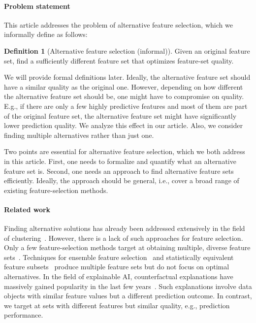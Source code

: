 \documentclass{article}
\theoremstyle{definition}
\newtheorem{definition}{Definition}
\begin{document}
\paragraph{Problem statement}

This article addresses the problem of alternative feature selection, which we informally define as follows:
%
\begin{definition}[Alternative feature selection (informal)]
	Given an original feature set, find a sufficiently different feature set that optimizes feature-set quality.
	\label{def:alternative-feature-selection}
\end{definition}
%
We will provide formal definitions later.
Ideally, the alternative feature set should have a similar quality as the original one.
However, depending on how different the alternative feature set should be, one might have to compromise on quality.
E.g., if there are only a few highly predictive features and most of them are part of the original feature set, the alternative feature set might have significantly lower prediction quality.
We analyze this effect in our article.
Also, we consider finding multiple alternatives rather than just one.

Two points are essential for alternative feature selection, which we both address in this article.
First, one needs to formalize and quantify what an alternative feature set is.
Second, one needs an approach to find alternative feature sets efficiently.
Ideally, the approach should be general, i.e., cover a broad range of existing feature-selection methods.

\paragraph{Related work}

Finding alternative solutions has already been addressed extensively in the field of clustering~\cite{bailey2014alternative}.
However, there is a lack of such approaches for feature selection.
Only a few feature-selection methods target at obtaining multiple, diverse feature sets~\cite{borboudakis2021extending, siddiqi2020genetic}.
Techniques for ensemble feature selection~\cite{saeys2008robust, seijo2017ensemble} and statistically equivalent feature subsets~\cite{lagani2017feature} produce multiple feature sets but do not focus on optimal alternatives.
In the field of explainable AI, counterfactual explanations have massively gained popularity in the last few years~\cite{stepin2021survey, verma2020counterfactual}.
Such explanations involve data objects with similar feature values but a different prediction outcome.
In contrast, we target at sets with different features but similar quality, e.g., prediction performance.
\end{document}
